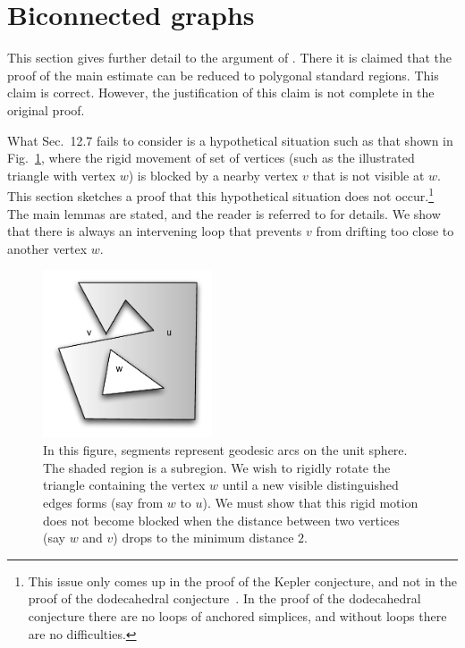 \documentclass[11pt]{amsart}
\begin{document}
\section{Biconnected graphs}


This section gives further detail to the argument of \cite[p131,Sec.12.7]{Hales:2006:DCG}.  There it is claimed that
the proof of the main estimate \cite[Theorem~12.1]{Hales:2006:DCG} can be reduced to polygonal standard regions.
This claim is correct. 
However, the justification of this claim is not complete in the original proof. 

What Sec.~12.7 fails to consider
is a hypothetical situation such as that shown in Fig.~\ref{fig:biconnected}, where the rigid movement of set of vertices (such as the illustrated triangle with vertex $w$)
is blocked by a nearby vertex $v$ that is not visible at $w$.  This section sketches a proof that this hypothetical situation does
not occur.\footnote{This issue only comes up in the proof of the Kepler conjecture, and not
in the proof of the dodecahedral conjecture~\cite{Hales:2008:Dodec}.  In the proof of the dodecahedral conjecture there are no loops of anchored simplices, and without loops there are no difficulties.}  
The main lemmas are stated, and the reader is referred to \cite{Hales:2008:Errata} for details.  We show that there is always an intervening loop
that prevents $v$ from drifting too close to another vertex $w$.


\begin{figure}
\caption{In this figure, segments represent geodesic arcs on the unit sphere.  The shaded region is a subregion.
We wish to rigidly rotate the triangle containing the vertex $w$ until a new visible distinguished edges forms
(say from $w$ to $u$).  We must show that this rigid motion does not become blocked when the distance between
two vertices (say $w$ and $v$) drops to the minimum distance $2$.}
\label{fig:biconnected}
\begin{center}
\includegraphics[width=5cm]{biconnected}
\end{center}
\end{figure}
\end{document}
